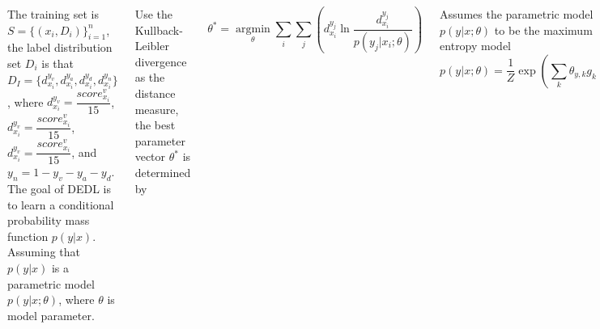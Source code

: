 \documentclass{tikzposter} %
\begin{document}
\begin{columns}
{  	The training set is $ S = \{ ( x_{i} , D_{i} )  \}^{n}_{i=1} $,
  	the label distribution set $ D_{i} $ is that
  	$ D_{I} = \{d^{y_{v}}_{x_{i}},  d^{y_{a}}_{x_{i}}, d^{y_{d}}_{x_{i}}, d^{y_{n}}_{x_{i}}\} $,
  	where
  	$ d^{y_{v}}_{x_{i}} = \dfrac{score^{v}_{x_{i}}}{15} $,
  	$ d^{y_{v}}_{x_{i}} = \dfrac{score^{v}_{x_{i}}}{15} $,
  	$ d^{y_{v}}_{x_{i}} = \dfrac{score^{v}_{x_{i}}}{15} $,
  	and $ y_{n} = 1 - y_{v}  - y_{a} - y_{d} $.
  	The goal of DEDL is to 
  	learn a  conditional probability mass function $ p(y|x) $.
  	Assuming that $ p(y|x) $
  	is a parametric model $ p(y|x;{\theta}) $,
  	where $ \theta $ is model parameter.
  	
  	Use the Kullback-Leibler divergence	as 
  	the distance measure,
  	the best parameter vector $ \theta^{\ast} $ is determined by
  	
  	\begin{equation}\label{eq:kl_divergence}
  	\theta^{\ast} =
  	\mathop{\arg\min}\limits_{\theta}
  	\sum\limits_{i}
  	\sum\limits_{j}
  	(d^{y_{j}}_{ x_{ i } }
  	\ln \dfrac{ d^{y_{j}}_{ x_{ i } } }{ p( y_{ j } | x_{ i } ;{\theta}) })
  	\end{equation}
  	
  	Assumes the parametric model 
  	$ p(y|x;{\theta}) $ 
  	to be the maximum entropy model	
  	\begin{equation}
  		 p(y|x;{\theta}) = \dfrac{1}{Z}
  		\exp ( \sum\limits_{k}
  		{\theta}_{y,k} 
  		g_{k}( \textbf{x})  ) 
  	\end{equation}
  	
  	where $ Z = \sum _{y}
  	\sum_{k}  {\theta}_{y,k}  g_{k}( \textbf{x}) $
  	is a normalization factor,
  	$ {\theta}_{y,k} $ is an element in \textbf {$\theta$} ,
  	and $ g_{k}( \textbf{x}) $ is the \textit{k}-th feature of \textbf{ x }
  
\
}




\end{columns}
\end{document}
